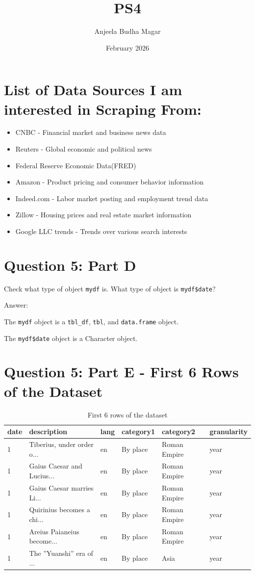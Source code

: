 \documentclass{article}
\title{PS4}
\author{Anjeela Budha Magar}
\date{February 2026}
\begin{document}
\maketitle

\section{List of Data Sources I am interested in Scraping From:}
\begin{itemize}
    \item CNBC - Financial market and business news data
    \item Reuters - Global economic and political news
    \item Federal Reserve Economic Data(FRED)
    \item Amazon - Product pricing and consumer behavior information
    \item Indeed.com - Labor market posting and employment trend data
    \item Zillow - Housing prices and real estate market information
    \item Google LLC trends - Trends over various search interests
\end{itemize}

\section{Question 5: Part D}
Check what type of object \texttt{mydf} is. What type of object is \texttt{mydf\$date}?

\vspace{6pt}

Answer:

The \texttt{mydf} object is a \texttt{tbl\_df}, \texttt{tbl}, and \texttt{data.frame} object.

The \texttt{mydf\$date} object is a Character object.
\section{ Question 5: Part E - First 6 Rows of the Dataset}

\begin{table}[H]
\centering
\begin{tabular}{llllll}
\toprule
date & description & lang & category1 & category2 & granularity \\
\midrule
1 & Tiberius, under order o... & en & By place & Roman Empire & year \\
1 & Gaius Caesar and Lucius... & en & By place & Roman Empire & year \\
1 & Gaius Caesar marries Li... & en & By place & Roman Empire & year \\
1 & Quirinius becomes a chi... & en & By place & Roman Empire & year \\
1 & Areius Paianeius become... & en & By place & Roman Empire & year \\
1 & The ''Yuanshi'' era of ... & en & By place & Asia & year \\
\bottomrule
\end{tabular}
\caption{First 6 rows of the dataset}
\end{table}
\end{document}
